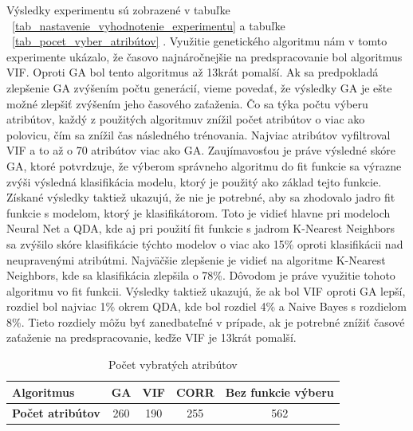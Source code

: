 \documentclass[runningheads]{llncs}
\begin{document}
Výsledky experimentu sú zobrazené v tabuľke ~\ref{tab_nastavenie_vyhodnotenie_experimentu} 
a tabuľke ~\ref{tab_pocet_vyber_atribútov} . Využitie genetického algoritmu
nám v tomto experimente ukázalo, že časovo najnáročnejšie na predspracovanie bol algoritmus 
VIF. Oproti GA bol tento algoritmus až 13krát pomalší. Ak sa predpokladá 
zlepšenie GA zvýšením počtu generácií, vieme povedať, že výsledky GA je ešte možné zlepšiť 
zvýšením jeho časového zaťaženia. Čo sa týka počtu výberu atribútov, každý z 
použitých algoritmuv znížil počet atribútov o viac ako polovicu, čím sa znížil čas následného 
trénovania. Najviac atribútov vyfiltroval VIF a to až o 70 atribútov viac ako GA. 
Zaujímavosťou je práve výsledné skóre GA, ktoré potvrdzuje, že výberom správneho algoritmu 
do fit funkcie sa výrazne zvýši výsledná klasifikácia modelu, ktorý je použitý
ako základ tejto funkcie. Získané výsledky taktiež ukazujú, že nie je potrebné, aby sa 
zhodovalo jadro fit funkcie s modelom, ktorý je klasifikátorom. Toto je vidieť 
hlavne pri modeloch Neural Net a QDA, kde aj pri použití fit funkcie s jadrom 
K-Nearest Neighbors sa zvýšilo skóre klasifikácie týchto modelov o viac ako 15\% oproti 
klasifikácii nad neupravenými atribútmi. Najväčšie zlepšenie je vidieť na algoritme 
K-Nearest Neighbors, kde sa klasifikácia zlepšila o 78\%. Dôvodom je práve využitie tohoto algoritmu vo fit funkcii.
Výsledky taktiež ukazujú, že ak bol VIF oproti GA lepší, rozdiel bol najviac 1\% okrem QDA, 
kde bol rozdiel 4\% a Naive Bayes s rozdielom 8\%. Tieto rozdiely môžu byť zanedbateľné v prípade, ak
je potrebné znížiť časové zaťaženie na predspracovanie, keďže VIF je 13krát pomalší.

\begin{table}[]
    \centering
    \caption{Počet vybratých atribútov}\label{tab_pocet_vyber_atributov}
    \begin{tabular}{|l|c|c|c|c|}
    \hline
    \textbf{Algoritmus}                  & GA        & VIF         & CORR          & Bez funkcie výberu \\ \hline
    \textbf{Počet atribútov}            & 260        & 190         & 255          & 562 \\ \hline
    \end{tabular}
\end{table}
\end{document}
